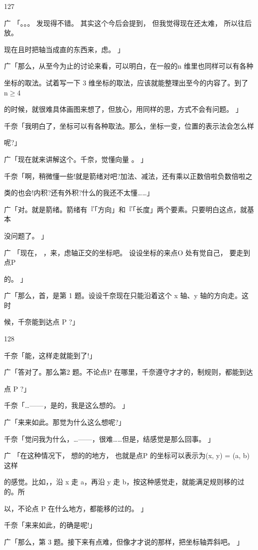 127\par
广 「。。。 发现得不错。 其实这个今后会提到， 但我觉得现在还太难， 所以往后放。\par
现在且时把轴当成直的东西来，虑。 」\par
广「那么，从至今为止的讨论来看，可以明白，在一般的n 维里也同样可以有各种\par
坐标的取法。试着写一下 3 维坐标的取法，应该就能整理出至今的内容了。到了 n$\geq$4\par
的时候，就很难具体画图来想了，但放心，用同样的思，方式不会有问题。 」\par
千奈「我明白了，坐标可以有各种取法。那么，坐标一变，位置的表示法会怎么样\par
呢?」\par
广「现在就来讲解这个。千奈，觉懂向量 。 」\par
千奈「啊，稍微懂一些!就是箭绪对吧?加法、减法，还有乘以正数倍啦负数倍啦之\par
类的也会!内积?还有外积?什么的我还不太懂……」\par
广「对。就是箭绪。箭绪有『「方向」和『「长度」两个要素。只要明白这点，就基本\par
没问题了。 」\par
广 「现在， ，来，虑轴正交的坐标吧。 设设坐标的来点O 处有觉自己， 要走到点P\par
的。 」\par
广「那么，首，是第 1 题。设设千奈现在只能沿着这个 x 轴、y 轴的方向走。这时\par
候，千奈能到达点 P  ?」\par

128\par
千奈「能，这样走就能到了!」\par
广「答对了。那么第2 题。不论点P 在哪里，千奈遵守才才的，制规则，都能到达\par
点 P  ?」\par
千奈「…——，是的，我是这么想的。 」\par
广「来来如此。那觉为什么这么想呢?」\par
千奈「觉问我为什么，…——，很难……但是，结感觉是那么回事。 」\par
广 「在这种情况下， 想的的地方， 也就是点P 的坐标可以表示为(x, y) = (a, b)这样\par
的感觉。比如，，沿 x 走 a，再沿 y 走 b，按这种感觉走，就能满足规则移的过的。所\par
以，不论点 P 在什么地方，都能移的过的。 」\par
千奈「来来如此，的确是呢!」\par
广「那么，第 3 题。接下来有点难，但像才才说的那样，把坐标轴弄斜吧。 」\par

